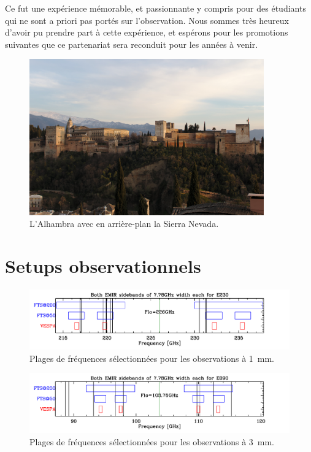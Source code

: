 \documentclass[a4paper,10pt,french]{article}
\newcommand{\troismm}{\SI{3}{\milli\meter}}
\newcommand{\unmm}{\SI{1}{\milli\meter}}
\begin{document}
Ce fut une expérience mémorable, et passionnante y compris pour des étudiants
qui ne sont a priori pas portés sur l’observation. Nous sommes très heureux
d’avoir pu prendre part à cette expérience, et espérons pour les promotions
suivantes que ce partenariat sera reconduit pour les années à venir.

\begin{figure}[!ht]
    \centering
    \includegraphics[width=0.9\textwidth]{alhambra.jpg}
    \caption{L’Alhambra avec en arrière-plan la Sierra Nevada.}
\end{figure}

\newpage

\appendix
\appendixpage
\addappheadtotoc

\section{Setups observationnels}
\label{app:setups}

\begin{figure}[!ht]
    \centering
    \includegraphics[width=\textwidth]{specsetup-1mm.pdf}
    \caption{Plages de fréquences sélectionnées pour les observations à \unmm.}
    \label{fig:specsetup_1mm}
\end{figure}

\begin{figure}[!ht]
    \centering
    \includegraphics[width=\textwidth]{specsetup-3mm.pdf}
    \caption{Plages de fréquences sélectionnées pour les observations à \troismm.}
    \label{fig:specsetup_3mm}
\end{figure}
\end{document}
